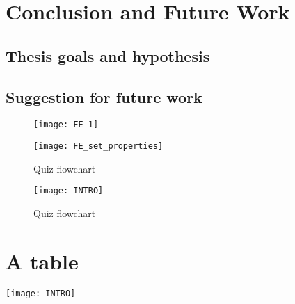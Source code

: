 \chapter{Conclusion and Future Work}
\section{Thesis goals and hypothesis}
\section{Suggestion for future work}



\begin{figure*}
\begin{multicols}{3}
\centering
    \texttt{[image: FE\_1]}
\caption{}
\label{fig:quiz_flowchart}\par

\texttt{[image: FE\_set\_properties]}
\caption{Quiz flowchart}
\label{fig:quiz_flowchart}\par

\texttt{[image: INTRO]}
\caption{Quiz flowchart}
\label{fig:quiz_flowchart}\par

\centering
    \end{multicols}
\end{figure*}


\appendix
\chapter{A table}
\texttt{[image: INTRO]}
\label{fig:quiz_flowchart}\par
